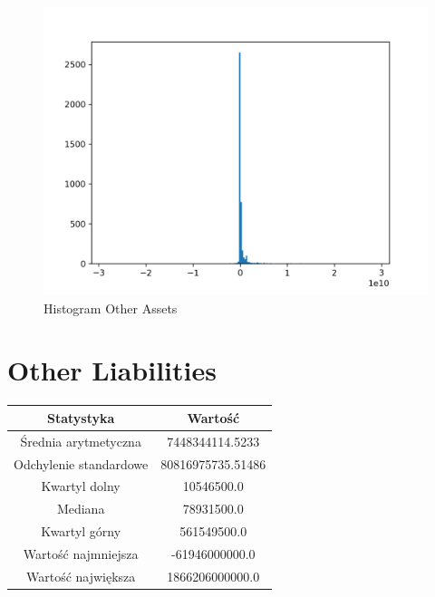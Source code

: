 \documentclass{article}
\begin{document}
\begin{figure}[h!]
    \includegraphics[width=\linewidth]{variables/Other Assets.png}
    \caption{Histogram Other Assets }
\end{figure}\section{ Other Liabilities }

\begin{center}
    \begin{tabular}{|c | c|} 
    \hline
    Statystyka & Wartość \\
    \hline\hline
    Średnia arytmetyczna & 7448344114.5233 \\ 
    \hline
    Odchylenie standardowe & 80816975735.51486 \\
    \hline
    Kwartyl dolny & 10546500.0 \\
    \hline
    Mediana & 78931500.0 \\
    \hline
    Kwartyl górny & 561549500.0 \\
    \hline
    Wartość najmniejsza & -61946000000.0 \\
    \hline
    Wartość największa & 1866206000000.0 \\
    \hline
   \end{tabular}
\end{center}
\end{document}
